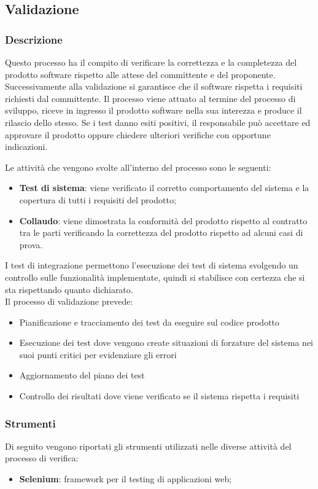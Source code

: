 \subsection{Validazione}
\label{sub:validazione}

\subsubsection{Descrizione}
\label{ssub:descrizione}

Questo processo ha il compito di verificare la correttezza e la completezza del prodotto software rispetto alle attese del committente e 
del proponente. Successivamente alla validazione si garantisce che il software rispetta i requisiti richiesti dal committente. 
Il processo viene attuato al termine del processo di sviluppo, riceve in ingresso il prodotto software nella sua interezza 
e produce il rilascio dello stesso. Se i test danno esiti positivi, il responsabile può accettare ed approvare il prodotto oppure chiedere ulteriori verifiche con opportune indicazioni. 

Le attività che vengono svolte all'interno del processo sono le seguenti:
\begin{itemize}
	\item \textbf{Test di sistema}: viene verificato il corretto comportamento del sistema e la 
    copertura di tutti i requisiti del prodotto;
	\item \textbf{Collaudo}: viene dimostrata la conformità del prodotto rispetto al contratto tra le 
    parti verificando la correttezza del prodotto rispetto ad alcuni casi di prova.
\end{itemize}

I test di integrazione permettono l’esecuzione dei test di sistema svolgendo un controllo sulle funzionalità implementate, quindi si stabilisce con certezza che si sta rispettando quanto dichiarato. \\
Il processo di validazione prevede:
\begin{itemize}
	\item Pianificazione e tracciamento dei test da eseguire sul codice prodotto
    \item Esecuzione dei test dove vengono create situazioni di forzature del sistema nei suoi punti critici per evidenziare gli errori
    \item Aggiornamento del piano dei test
    \item Controllo dei risultati dove viene verificato se il sistema rispetta i requisiti 
\end{itemize}


\subsubsection{Strumenti}
\label{ssub:validazione:strumenti}

Di seguito vengono riportati gli strumenti utilizzati nelle diverse attività del processo di verifica:
\begin{itemize}
	\item \textbf{Selenium}: framework per il testing di applicazioni web;
\end{itemize}

